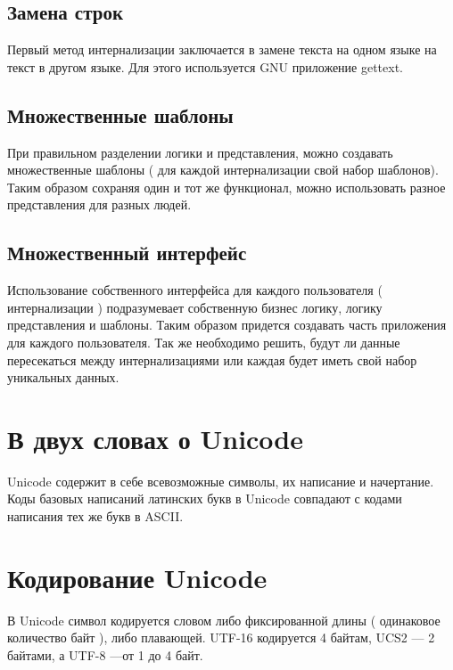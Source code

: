 \subsection{Замена строк} \label{sect4_3_1}

Первый метод интернализации заключается в замене текста на одном языке на текст в другом языке. Для этого используется GNU приложение gettext.

\subsection{Множественные шаблоны} \label{sect4_3_2}

При правильном разделении логики и представления, можно создавать множественные шаблоны ( для каждой интернализации свой набор шаблонов). Таким образом сохраняя один и тот же функционал, можно использовать разное представления для разных людей.


\subsection{Множественный интерфейс} \label{sect4_3_3}

Использование собственного интерфейса для каждого пользователя ( интернализации ) подразумевает собственную бизнес логику, логику представления и шаблоны. Таким образом  придется создавать часть приложения для каждого пользователя. Так же необходимо решить, будут ли данные пересекаться между интернализациями или каждая будет иметь свой набор уникальных данных.

\section{В двух словах о Unicode} \label{sect4_4}

Unicode содержит в себе всевозможные символы, их написание и начертание. Коды базовых написаний латинских букв в Unicode совпадают с кодами написания тех же букв в ASCII. 


\section{Кодирование Unicode} \label{sect4_5}

В Unicode символ кодируется словом либо фиксированной длины ( одинаковое количество байт ), либо плавающей. UTF-16 кодируется 4 байтам, UCS2 --- 2 байтами,  а UTF-8 ---от 1 до 4 байт.

